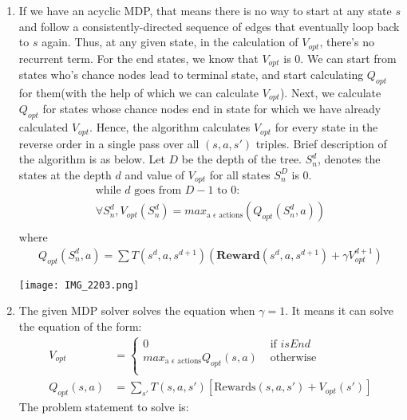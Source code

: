 \documentclass[12pt]{article}
\begin{document}
\begin{enumerate}[label=(\alph*)]
	\addtocounter{enumi}{1}
	\item If we have an acyclic MDP, that means there is no way to start at any state $s$ and follow a consistently-directed sequence of edges that eventually loop back to $s$ again. Thus, at any given state, in the calculation of $V_{opt}$, there's no recurrent term. For the end states, we know that $V_{opt}$ is $0$. We can start from states who's chance nodes lead to terminal state, and start calculating $Q_{opt}$ for them(with the help of which we can calculate $V_{opt}$). Next, we calculate $Q_{opt}$ for states whose chance nodes end in state for which we have already calculated $V_{opt}$. Hence, the algorithm calculates $V_{opt}$ for every state in the reverse order in a single pass over all $(s,a,s')$ triples.
	Brief description of the algorithm is as below. Let $D$ be the depth of the tree. $S_{n}^d$, denotes the states at the depth $d$ and value of $V_{opt}$ for all states $S_{n}^D$ is 0.
	\begin{align*}
	\text{while $d$ goes from $D-1$ to $0$:} \\
	\forall S_{n}^d, V_{opt}(S_{n}^d) = max_{\text{a }\epsilon \text{ actions}}(Q_{opt}(S_{n}^d, a)) \\
	\end{align*}	
	where \\
	\begin{align*}
	Q_{opt}(S_{n}^d, a) = \sum T(s^d,a,s^{d+1}) (\textbf{Reward}(s^d,a,s^{d+1}) + \gamma V_{opt}^{d+1})
	\end{align*}
	\begin{center}
	\texttt{[image: IMG\_2203.png]}
	\end{center}
	\item The given MDP solver solves the equation when $\gamma = 1$. It means it can solve the equation of the form:
	\begin{align*}
	V_{opt} &= \begin{cases}
	0 & \text{  if $isEnd$} \\
	max_{\text{a } \epsilon \text{ actions}} Q_{opt}(s, a) & \text{  otherwise} \\
	\end{cases} \\
	Q_{opt} (s, a) &= \sum_{s'} T(s, a, s')[\text{Rewards} (s,a,s') + V_{opt}(s')]
	\end{align*}
	The problem statement to solve is: \\
	\begin{align*}

\end{align*}
\end{enumerate}
\end{document}
